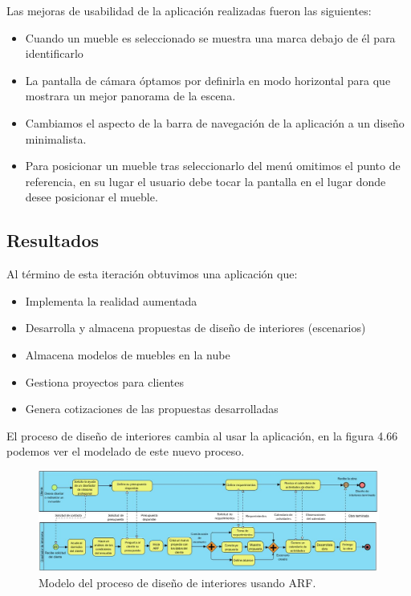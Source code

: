 Las mejoras de usabilidad de la aplicación realizadas fueron las siguientes:
\begin{itemize}
	\item Cuando un mueble es seleccionado se muestra una marca debajo de él para identificarlo
	\item La pantalla de cámara óptamos por definirla en modo horizontal para que mostrara un mejor panorama de la escena.
	\item Cambiamos el aspecto de la barra de navegación de la aplicación a un diseño minimalista.
	\item Para posicionar un mueble tras seleccionarlo del menú omitimos el punto de referencia, en su lugar el usuario debe tocar la pantalla en el lugar donde desee posicionar el mueble.
\end{itemize}

\subsection{Resultados}
Al término de esta iteración obtuvimos una aplicación que:
\begin{itemize}
	\item Implementa la realidad aumentada
	\item Desarrolla y almacena propuestas de diseño de interiores (escenarios)
	\item Almacena modelos de muebles en la nube
	\item Gestiona proyectos para clientes
	\item Genera cotizaciones de las propuestas desarrolladas
\end{itemize}

El proceso de diseño de interiores cambia al usar la aplicación, en la figura 4.66 podemos ver el modelado de este nuevo proceso.
\begin{figure}[!htbp]
	\centering
	\includegraphics[width=20cm,angle=270,origin=c]{imagenes/desarrollo/diagramas/NPMN_FINAL_ID.jpg}
	\caption{Modelo del proceso de diseño de interiores usando ARF.}
	\label{fig:bpmnarf}
\end{figure}
\clearpage